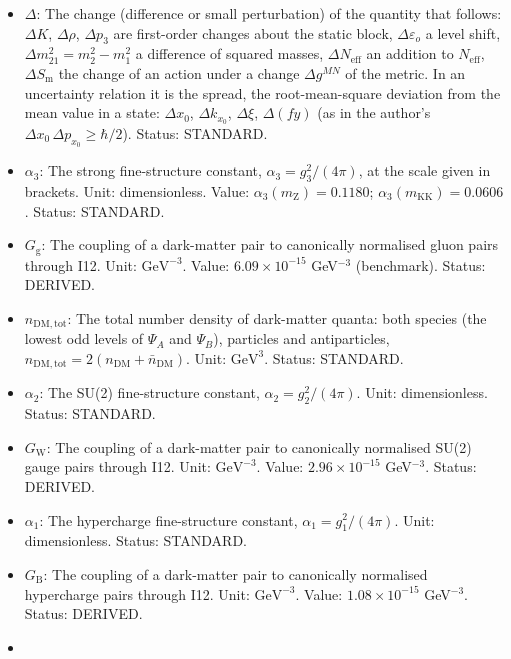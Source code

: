 \documentclass[
  10pt,
]{article}
\providecommand{\tightlist}{%
  \setlength{\itemsep}{0pt}\setlength{\parskip}{0pt}}
\begin{document}
\begin{itemize}
\tightlist
\item
  \(\Delta\): The change (difference or small perturbation) of the
  quantity that follows: \(\Delta K\), \(\Delta\rho\), \(\Delta p_3\)
  are first-order changes about the static block,
  \(\Delta\varepsilon_o\) a level shift,
  \(\Delta m^2_{21} = m_2^2 - m_1^2\) a difference of squared masses,
  \(\Delta N_{\mathrm{eff}}\) an addition to \(N_{\mathrm{eff}}\),
  \(\Delta S_{\mathrm{m}}\) the change of an action under a change
  \(\Delta g^{MN}\) of the metric. In an uncertainty relation it is the
  spread, the root-mean-square deviation from the mean value in a state:
  \(\Delta x_0\), \(\Delta k_{x_0}\), \(\Delta\xi\), \(\Delta(fy)\) (as
  in the author's \(\Delta x_0\,\Delta p_{x_0} \ge \hbar/2\)). Status:
  STANDARD.
\item
  \(\alpha_3\): The strong fine-structure constant,
  \(\alpha_3 = g_3^2/(4\pi)\), at the scale given in brackets. Unit:
  dimensionless. Value: \(\alpha_3(m_{\mathrm{Z}}) = 0.1180\);
  \(\alpha_3(m_{\mathrm{KK}}) = 0.0606\). Status: STANDARD.
\item
  \(G_{\mathrm{g}}\): The coupling of a dark-matter pair to canonically
  normalised gluon pairs through I12. Unit: \(\mathrm{GeV}^{-3}\).
  Value: \(6.09\times10^{-15}\) GeV\(^{-3}\) (benchmark). Status:
  DERIVED.
\item
  \(n_{\mathrm{DM,tot}}\): The total number density of dark-matter
  quanta: both species (the lowest odd levels of \(\Psi_A\) and
  \(\Psi_B\)), particles and antiparticles,
  \(n_{\mathrm{DM,tot}} = 2(n_{\mathrm{DM}} + \bar n_{\mathrm{DM}})\).
  Unit: \(\mathrm{GeV}^{3}\). Status: STANDARD.
\item
  \(\alpha_2\): The SU(2) fine-structure constant,
  \(\alpha_2 = g_2^2/(4\pi)\). Unit: dimensionless. Status: STANDARD.
\item
  \(G_{\mathrm{W}}\): The coupling of a dark-matter pair to canonically
  normalised SU(2) gauge pairs through I12. Unit: \(\mathrm{GeV}^{-3}\).
  Value: \(2.96\times10^{-15}\) GeV\(^{-3}\). Status: DERIVED.
\item
  \(\alpha_1\): The hypercharge fine-structure constant,
  \(\alpha_1 = g_1^2/(4\pi)\). Unit: dimensionless. Status: STANDARD.
\item
  \(G_{\mathrm{B}}\): The coupling of a dark-matter pair to canonically
  normalised hypercharge pairs through I12. Unit: \(\mathrm{GeV}^{-3}\).
  Value: \(1.08\times10^{-15}\) GeV\(^{-3}\). Status: DERIVED.
\item

\end{itemize}
\end{document}
